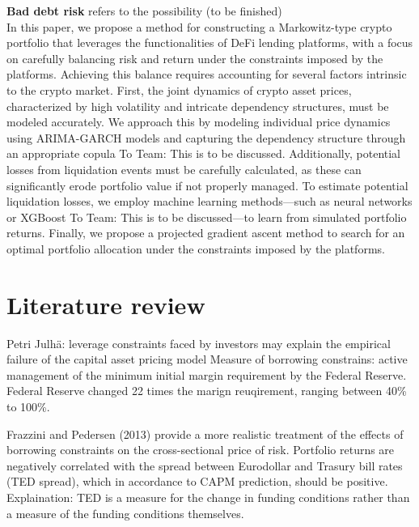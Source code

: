 \documentclass{article} %
\providecommand{\red}[1]{\textcolor{BrickRed}{#1}}
\theoremstyle{plain}
\theoremstyle{definition} %
\begin{document}
{\bf Bad debt risk} refers to the possibility (to be finished)\\%

In this paper, we propose a method for constructing a Markowitz-type crypto portfolio that leverages the functionalities of DeFi lending platforms, 
 with a focus on carefully balancing risk and return under the constraints imposed by the platforms. 
 Achieving this balance requires accounting for several factors intrinsic to the crypto market. 
 First, the joint dynamics of crypto asset prices, characterized by high volatility and intricate dependency structures, must be modeled accurately. 
 We approach this by modeling individual price dynamics using ARIMA-GARCH models and capturing the dependency structure through an appropriate copula {\red{To Team: This is to be discussed}}.
 Additionally, potential losses from liquidation events must be carefully calculated, as these can significantly erode portfolio value if not properly managed.
 To estimate potential liquidation losses, we employ machine learning methods—such as neural networks or XGBoost {\red{To Team: This is to be discussed}}—to learn from simulated portfolio returns.
 Finally, we propose a projected gradient ascent method to search for an optimal portfolio allocation under the constraints imposed by the platforms. 


\section{Literature review}
Petri Julhä: leverage constraints faced by investors may explain the empirical failure of the capital asset pricing model
Measure of borrowing constrains: active management of the minimum initial margin requirement by the Federal Reserve. 
Federal Reserve changed 22 times the marign reuqirement, ranging between 40\% to 100\%. 


Frazzini and Pedersen (2013) provide a more realistic treatment of the effects of borrowing constraints on the cross-sectional price of risk. 
Portfolio returns are negatively correlated with the spread between Eurodollar and Trasury bill rates (TED spread), which in accordance to CAPM prediction, should be positive. 
Explaination: TED is a measure for the change in funding conditions rather than a measure of the funding conditions themselves. 
\end{document}
